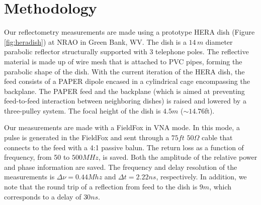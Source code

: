 \documentclass[12pt,preprint]{aastex}
\begin{document}
\section{Methodology}{\label{sec:methods}}

Our reflectometry measurements are made using a prototype HERA dish (Figure
\ref{fig:heradish}) at NRAO in Green Bank, WV. The dish is a $14\,m$ diameter
parabolic reflector structurally supported with 3 telephone poles. The
reflective material is made up of wire mesh that is attached to PVC
pipes, forming the parabolic shape of the dish. With the current iteration of
the HERA dish, the feed consists of a PAPER dipole encased in a cylindrical cage
encompassing the backplane. The PAPER feed and the backplane (which is aimed at
preventing feed-to-feed interaction between neighboring dishes) is raised and
lowered by a three-pulley system. The focal height of the dish is $4.5m$
($\sim{14.76}$ft).  


Our measurements are made with a FieldFox in VNA mode. In this mode, a pulse
is generated in the FieldFox and sent through a $75ft$ $50\Omega$ cable that
connects to the feed with a 4:1 passive balun. The return loss as a function of
frequency, from 50 to $500MHz$, is saved.  Both the amplitude of the relative
power and phase information are saved.  The frequency and delay resolution of
the measurements is $\Delta\nu = 0.44 Mhz$ and $\Delta{t}=2.22ns$, respectively.
In addition, we note that the round trip of a reflection from feed to the dish
is $9m$, which corresponds to a delay of $30ns$.



\end{document}
